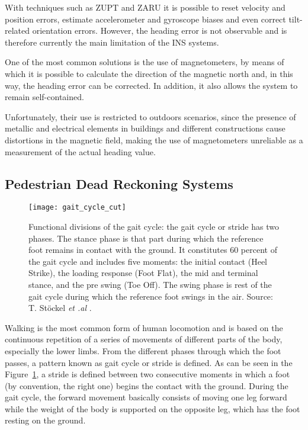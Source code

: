 \begin{description}
	With techniques such as ZUPT and ZARU it is possible to reset velocity and position errors, estimate accelerometer and gyroscope biases and even correct tilt-related orientation errors.
	However, the heading error is not observable and is therefore currently the main limitation of the INS systems.
	
	One of the most common solutions is the use of magnetometers, by means of which it is possible to calculate the direction of the magnetic north and, in this way, the heading error can be corrected. In addition, it also allows the system to remain self-contained.
	
	Unfortunately, their use is restricted to outdoors scenarios, since the presence of metallic and electrical elements in buildings and different constructions cause distortions in the magnetic field, making the use of magnetometers unreliable as a measurement of the actual heading value.		
\end{description}	
\subsection{Pedestrian Dead Reckoning Systems}
\label{sec:2_3_2_DR_PDR}
\begin{figure}[!t]
	\centering
	\texttt{[image: gait\_cycle\_cut]}
	\caption[Functional divisions of the gait cycle]{Functional divisions of the gait cycle: the gait cycle or stride has two phases. The stance phase is that part during which the reference foot remains in contact with the ground. It constitutes 60 percent of the gait cycle and includes five moments: the initial contact (Heel Strike), the loading response (Foot Flat), the mid and terminal stance, and the pre swing (Toe Off). The swing phase is rest of the gait cycle during which the reference foot swings in the air. Source: T. Stöckel \emph{et .al} \cite{stockel_mental_2015}.}
	\label{fig:GaitCycle}
\end{figure}
Walking is the most common form of human locomotion and is based on the continuous repetition of a series of movements of different parts of the body, especially the lower limbs.
From the different phases through which the foot passes, a pattern known as gait cycle or stride is defined.
As can be seen in the Figure~\ref{fig:GaitCycle}, a stride is defined between two consecutive moments in which a foot (by convention, the right one) begins the contact with the ground.
During the gait cycle, the forward movement basically consists of moving one leg forward while the weight of the body is supported on the opposite leg, which has the foot resting on the ground.


